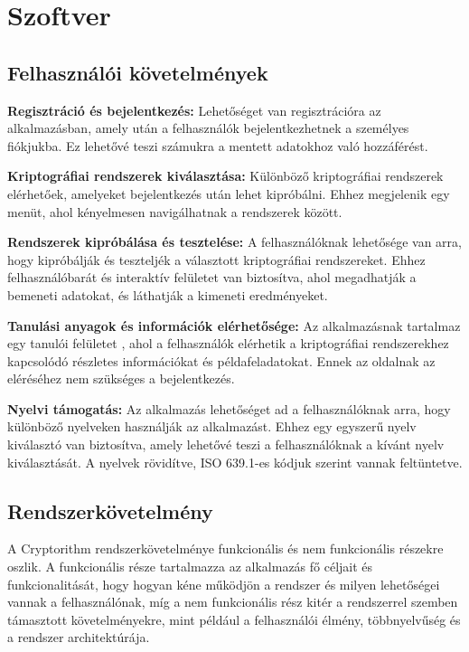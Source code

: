 \chapter{Szoftver}

\section{Felhasználói követelmények}

\textbf{Regisztráció és bejelentkezés:} Lehetőséget van regisztrációra az alkalmazásban, amely után a felhasználók bejelentkezhetnek a személyes fiókjukba. Ez lehetővé teszi számukra a mentett adatokhoz való hozzáférést.

\textbf{Kriptográfiai rendszerek kiválasztása:} Különböző kriptográfiai rendszerek elérhetőek, amelyeket bejelentkezés után lehet kipróbálni. Ehhez megjelenik egy menüt, ahol kényelmesen navigálhatnak a rendszerek között.

\textbf{Rendszerek kipróbálása és tesztelése:} A felhasználóknak lehetősége van arra, hogy kipróbálják és teszteljék a választott kriptográfiai rendszereket. Ehhez felhasználóbarát és interaktív felületet van biztosítva, ahol megadhatják a bemeneti adatokat, és láthatják a kimeneti eredményeket.

\textbf{Tanulási anyagok és információk elérhetősége:} Az alkalmazásnak tartalmaz egy tanulói felületet , ahol a felhasználók elérhetik a kriptográfiai rendszerekhez kapcsolódó részletes információkat és példafeladatokat. Ennek az oldalnak az eléréséhez nem szükséges a bejelentkezés.

\textbf{Nyelvi támogatás:} Az alkalmazás lehetőséget ad a felhasználóknak arra, hogy különböző nyelveken használják az alkalmazást. Ehhez egy egyszerű nyelv kiválasztó van biztosítva, amely lehetővé teszi a felhasználóknak a kívánt nyelv kiválasztását. A nyelvek rövidítve, ISO 639.1-es kódjuk szerint vannak feltüntetve.

\newpage
\section{Rendszerkövetelmény}
A Cryptorithm rendszerkövetelménye funkcionális és nem funkcionális részekre oszlik. A funkcionális része tartalmazza az alkalmazás fő céljait és funkcionalitását, hogy hogyan kéne működjön a rendszer és milyen lehetőségei vannak a felhasználónak, míg a nem funkcionális rész kitér a rendszerrel szemben támasztott követelményekre, mint például a felhasználói élmény, többnyelvűség és a rendszer architektúrája.

